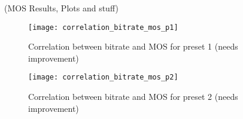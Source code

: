 (MOS Results, Plots and stuff)

\begin{figure}[!t]
	\centering
	\texttt{[image: correlation\_bitrate\_mos\_p1]}
	\caption{Correlation between bitrate and MOS for preset 1 (needs improvement)}
	\label{fig:result:correlation_bitrate_mos}
\end{figure}

\begin{figure}[!t]
\centering
\texttt{[image: correlation\_bitrate\_mos\_p2]}
\caption{Correlation between bitrate and MOS for preset 2 (needs improvement)}
\label{fig:result:correlation_bitrate_mos}
\end{figure}
